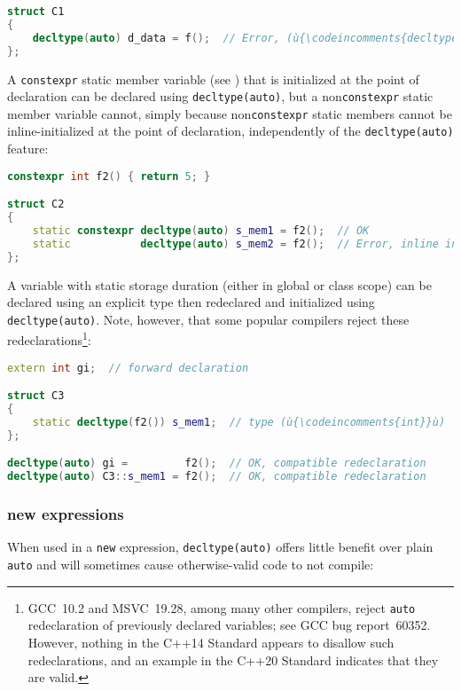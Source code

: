 \begin{lstlisting}[language=C++]
struct C1
{
    decltype(auto) d_data = f();  // Error, (ù{\codeincomments{decltype(auto)}}ù) for member variable
};
\end{lstlisting}
    

A \lstinline!constexpr! static member variable (see
) that is initialized at the point of
declaration can be declared using \lstinline!decltype(auto)!, but a
non\lstinline!constexpr! static member variable cannot, simply because
non\lstinline!constexpr! static members cannot be inline-initialized at the
point of declaration, independently of the \lstinline!decltype(auto)!
feature:

\begin{lstlisting}[language=C++]
constexpr int f2() { return 5; }

struct C2
{
    static constexpr decltype(auto) s_mem1 = f2();  // OK
    static           decltype(auto) s_mem2 = f2();  // Error, inline init
};
\end{lstlisting}
    

A variable with static storage duration (either in global or class
scope) can be declared using an explicit type then redeclared and
initialized using \lstinline!decltype(auto)!. Note, however, that some
popular compilers reject these redeclarations{\cprotect\footnote{GCC~10.2 and MSVC~19.28, among many other compilers, reject \lstinline!auto!
redeclaration of previously declared variables; see
GCC bug report~60352. However, nothing in the C++14 Standard appears
to disallow such redeclarations, and an example in the C++20 Standard
  indicates that they are valid.}}:

\begin{lstlisting}[language=C++]
extern int gi;  // forward declaration

struct C3
{
    static decltype(f2()) s_mem1;  // type (ù{\codeincomments{int}}ù)
};

decltype(auto) gi =         f2();  // OK, compatible redeclaration
decltype(auto) C3::s_mem1 = f2();  // OK, compatible redeclaration
\end{lstlisting}
    

\subsubsection[\lstinline!new! expressions]{{\SubsubsecCode new} expressions}\label{new-expressions}

When used in a \lstinline!new! expression, \lstinline!decltype(auto)! offers
little benefit over plain \lstinline!auto! and will sometimes cause
otherwise-valid code to not compile:

